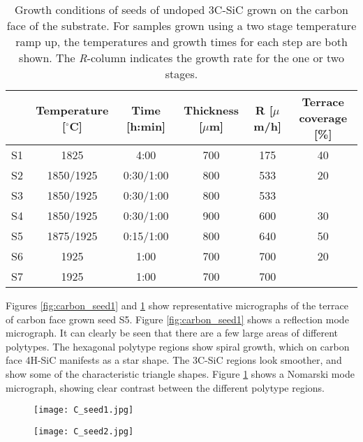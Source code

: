 \begin{table}[h]
\small
\caption{Growth conditions of seeds of undoped 3C-SiC grown on the carbon face of the substrate. For samples grown using a two stage temperature ramp up, the temperatures and growth times for each step are both shown. The \emph{R}-column indicates the growth rate for the one or two stages.}
\label{tab:seeds}
\begin{center}
\begin{tabular}{l c c c c c}
  \hline                       
  \hline       
  \vspace{1mm}
   & \small{Temperature [$^\circ$C]} & \small{Time [h:min]} & \small{Thickness [$\mu$m]} & R [$\mu$m/h] &\small{Terrace coverage [\%]}\\
    \hline
  S1 & 1825 & 4:00 & 700 & 175 & 40\\
  S2 & 1850/1925 & 0:30/1:00 & 800 & 533 &20\\
  S3 & 1850/1925 & 0:30/1:00 & 800 & 533 &\\
  S4 & 1850/1925 & 0:30/1:00 & 900 & 600 &30\\
  S5 & 1875/1925 & 0:15/1:00 & 800 & 640 & 50\\
  S6 & 1925 & 1:00 & 700 & 700 & 20\\
  S7 & 1925 & 1:00 & 700 & 700 &\\
  \hline  
\end{tabular}
\end{center}
\end{table}


Figures \ref{fig:carbon_seed1} and \ref{fig:carbon_seed2} show representative micrographs of the terrace of carbon face grown seed S5. Figure \ref{fig:carbon_seed1} shows a reflection mode micrograph. It can clearly be seen that there are a few large areas of different polytypes. The hexagonal polytype regions show spiral growth, which on carbon face 4H-SiC manifests as a star shape. The 3C-SiC regions look smoother, and show some of the characteristic triangle shapes. Figure \ref{fig:carbon_seed2} shows a Nomarski mode micrograph, showing clear contrast between the different polytype regions. 

\begin{figure}[h]
\centering
\begin{minipage}{.5\textwidth}
  \centering
  \texttt{[image: C\_seed1.jpg]}
  \label{fig:carbon_seed1}
\end{minipage}%
\begin{minipage}{.5\textwidth}
  \centering
  \texttt{[image: C\_seed2.jpg]}
  \label{fig:carbon_seed2}
\end{minipage}
\end{figure}

